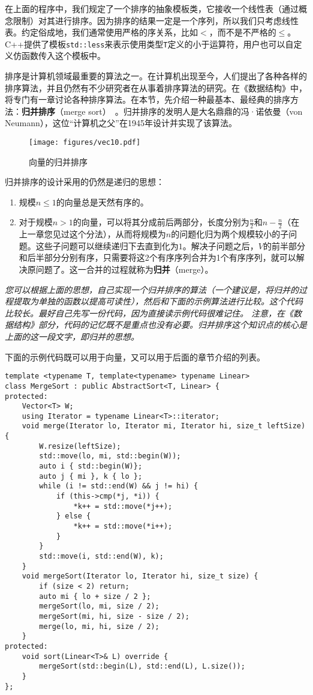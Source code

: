 在上面的程序中，我们规定了一个排序的抽象模板类，它接收一个线性表（通过概念限制）对其进行排序。因为排序的结果一定是一个序列，所以我们只考虑线性表。约定俗成地，我们通常使用严格的序关系，比如$<$，而不是不严格的$\le$。C++提供了模板\lstinline{std::less}来表示使用类型\lstinline{T}定义的小于运算符，用户也可以自定义仿函数传入这个模板中。

排序是计算机领域最重要的算法之一。在计算机出现至今，人们提出了各种各样的排序算法，并且仍然有不少研究者在从事着排序算法的研究。在《数据结构》中，将专门有一章讨论各种排序算法。在本节，先介绍一种最基本、最经典的排序方法：\textbf{归并排序}（merge sort）~\cite{knuth1997art}。归并排序的发明人是大名鼎鼎的冯·诺依曼（von Neumann），这位“计算机之父”在1945年设计并实现了该算法。


\begin{figure}[H]
  \centering
  \texttt{[image: figures/vec10.pdf]}
  \caption{向量的归并排序}
  \label{fig:vec10}
\end{figure}


归并排序的设计采用的仍然是递归的思想：
\begin{enumerate}
    \item 规模$n\le 1$的向量总是天然有序的。
    \item 对于规模$n > 1$的向量，可以将其分成前后两部分，长度分别为$\frac{n}2$和$n-\frac{n}2$（在上一章您见过这个分法），从而将规模为$n$的问题化归为两个规模较小的子问题。这些子问题可以继续递归下去直到化为$1$。解决子问题之后，$V$的前半部分和后半部分分别有序，只需要将这2个有序序列合并为1个有序序列，就可以解决原问题了。这一合并的过程就称为\textbf{归并}（merge）。
\end{enumerate}

\textit{您可以根据上面的思想，自己实现一个归并排序的算法（一个建议是，将归并的过程提取为单独的函数以提高可读性），然后和下面的示例算法进行比较。这个代码比较长。最好自己先写一份代码，因为直接读示例代码很难记住。
注意，在《数据结构》部分，代码的记忆既不是重点也没有必要。归并排序这个知识点的核心是上面的这一段文字，即归并的思想。}

下面的示例代码既可以用于向量，又可以用于后面的章节介绍的列表。

\begin{lstlisting}
template <typename T, template<typename> typename Linear>
class MergeSort : public AbstractSort<T, Linear> {
protected:
    Vector<T> W;
    using Iterator = typename Linear<T>::iterator;
    void merge(Iterator lo, Iterator mi, Iterator hi, size_t leftSize) {
        W.resize(leftSize);
        std::move(lo, mi, std::begin(W));
        auto i { std::begin(W)};
        auto j { mi }, k { lo };
        while (i != std::end(W) && j != hi) {
            if (this->cmp(*j, *i)) {
                *k++ = std::move(*j++);
            } else {
                *k++ = std::move(*i++);
            }
        }
        std::move(i, std::end(W), k);
    }
    void mergeSort(Iterator lo, Iterator hi, size_t size) {
        if (size < 2) return;
        auto mi { lo + size / 2 };
        mergeSort(lo, mi, size / 2);
        mergeSort(mi, hi, size - size / 2);
        merge(lo, mi, hi, size / 2);
    }
protected:
    void sort(Linear<T>& L) override {
        mergeSort(std::begin(L), std::end(L), L.size());
    }
};
\end{lstlisting}

